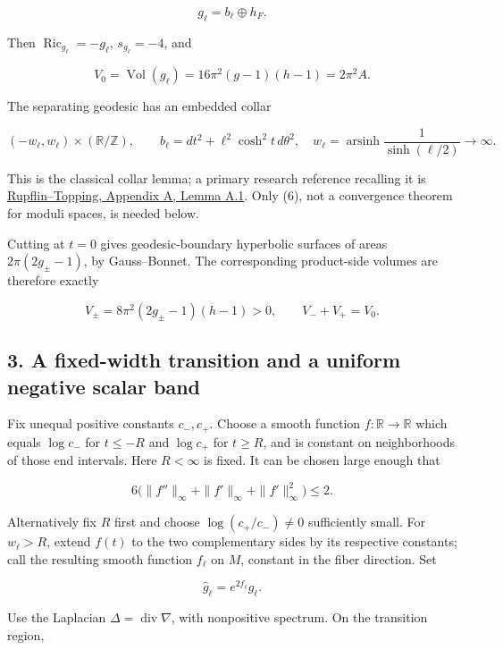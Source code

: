 \documentclass[
  11pt,
]{article}
\begin{document}
\[
 g_\ell=b_\ell\oplus h_F.
\]

Then \(\operatorname{Ric}_{g_\ell}=-g_\ell\), \(s_{g_\ell}=-4\), and

\[
 V_0=\operatorname{Vol}(g_\ell)
 =16\pi^2(g-1)(h-1)=2\pi^2A.
 \tag{5}
\]

The separating geodesic has an embedded collar

\[
 (-w_\ell,w_\ell)\times(\mathbb R/\mathbb Z),\qquad
 b_\ell=dt^2+\ell^2\cosh^2t\,d\theta^2,
 \quad w_\ell=\operatorname{arsinh}\frac1{\sinh(\ell/2)}\to\infty.
 \tag{6}
\]

This is the classical collar lemma; a primary research reference
recalling it is
\href{https://arxiv.org/pdf/1605.06691}{Rupflin--Topping, Appendix A,
Lemma A.1}. Only (6), not a convergence theorem for moduli spaces, is
needed below.

Cutting at \(t=0\) gives geodesic-boundary hyperbolic surfaces of areas
\(2\pi(2g_\pm-1)\), by Gauss--Bonnet. The corresponding product-side
volumes are therefore exactly

\[
 V_\pm=8\pi^2(2g_\pm-1)(h-1)>0,\qquad V_-+V_+=V_0.
 \tag{7}
\]

\hypertarget{a-fixed-width-transition-and-a-uniform-negative-scalar-band}{%
\subsection{3. A fixed-width transition and a uniform negative scalar
band}\label{a-fixed-width-transition-and-a-uniform-negative-scalar-band}}

Fix unequal positive constants \(c_-,c_+\). Choose a smooth function
\(f:\mathbb R\to\mathbb R\) which equals \(\log c_-\) for \(t\le-R\) and
\(\log c_+\) for \(t\ge R\), and is constant on neighborhoods of those
end intervals. Here \(R<\infty\) is fixed. It can be chosen large enough
that

\[
 6\bigl(\|f''\|_\infty+\|f'\|_\infty+\|f'\|_\infty^2\bigr)\le2.
 \tag{8}
\]

Alternatively fix \(R\) first and choose \(\log(c_+/c_-)\ne0\)
sufficiently small. For \(w_\ell>R\), extend \(f(t)\) to the two
complementary sides by its respective constants; call the resulting
smooth function \(f_\ell\) on \(M\), constant in the fiber direction.
Set

\[
 \widehat g_\ell=e^{2f_\ell}g_\ell.
 \tag{9}
\]

Use the Laplacian \(\Delta=\operatorname{div}\nabla\), with nonpositive
spectrum. On the transition region,
\end{document}
